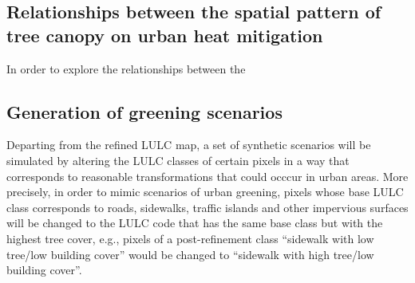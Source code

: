\documentclass[10pt,letterpaper]{article}
\begin{document}
\subsection*{Relationships between the spatial pattern of tree canopy on urban heat mitigation}

In order to explore the relationships between the \cite{rey2010pysal}



\subsection*{Generation of greening scenarios}

Departing from the refined LULC map, a set of synthetic scenarios will be simulated by altering the LULC classes of certain pixels in a way that corresponds to reasonable transformations that could occcur in urban areas.
More precisely, in order to mimic scenarios of urban greening, pixels whose base LULC class corresponds to roads, sidewalks, traffic islands and other impervious surfaces will be changed to the LULC code that has the same base class but with the highest tree cover, e.g.,  pixels of a post-refinement class ``sidewalk with low tree/low building cover'' would be changed to ``sidewalk with high tree/low building cover''.
\end{document}

